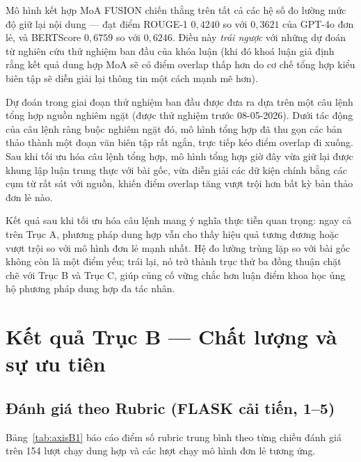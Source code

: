 Mô hình kết hợp MoA FUSION chiến thắng trên tất cả các hệ số đo lường mức độ giữ lại nội dung --- đạt điểm ROUGE-1 $0,4240$ so với $0,3621$ của GPT-4o đơn lẻ, và BERTScore $0,6759$ so với $0,6246$. Điều này \textit{trái ngược} với những dự đoán từ nghiên cứu thử nghiệm ban đầu của khóa luận (khi đó khoá luận giả định rằng kết quả dung hợp MoA sẽ có điểm overlap thấp hơn do cơ chế tổng hợp kiểu biên tập sẽ diễn giải lại thông tin một cách mạnh mẽ hơn).

Dự đoán trong giai đoạn thử nghiệm ban đầu được đưa ra dựa trên một câu lệnh tổng hợp nguồn nghiêm ngặt (được thử nghiệm trước 08-05-2026). Dưới tác động của câu lệnh ràng buộc nghiêm ngặt đó, mô hình tổng hợp đã thu gọn các bản thảo thành một đoạn văn biên tập rất ngắn, trực tiếp kéo điểm overlap đi xuống. Sau khi tối ưu hóa câu lệnh tổng hợp, mô hình tổng hợp giờ đây vừa giữ lại được khung lập luận trung thực với bài gốc, vừa diễn giải các dữ kiện chính bằng các cụm từ rất sát với nguồn, khiến điểm overlap tăng vượt trội hơn bất kỳ bản thảo đơn lẻ nào.

Kết quả sau khi tối ưu hóa câu lệnh mang ý nghĩa thực tiễn quan trọng: ngay cả trên Trục A, phương pháp dung hợp vẫn cho thấy hiệu quả tương đương hoặc vượt trội so với mô hình đơn lẻ mạnh nhất. Hệ đo lường trùng lặp so với bài gốc không còn là một điểm yếu; trái lại, nó trở thành trục thứ ba đồng thuận chặt chẽ với Trục B và Trục C, giúp củng cố vững chắc hơn luận điểm khoa học ủng hộ phương pháp dung hợp đa tác nhân.

\section{Kết quả Trục B --- Chất lượng và sự ưu tiên}

\subsection{Đánh giá theo Rubric (FLASK cải tiến, 1--5)}

Bảng~\ref{tab:axisB1} báo cáo điểm số rubric trung bình theo từng chiều đánh giá trên 154 lượt chạy dung hợp và các lượt chạy mô hình đơn lẻ tương ứng.

